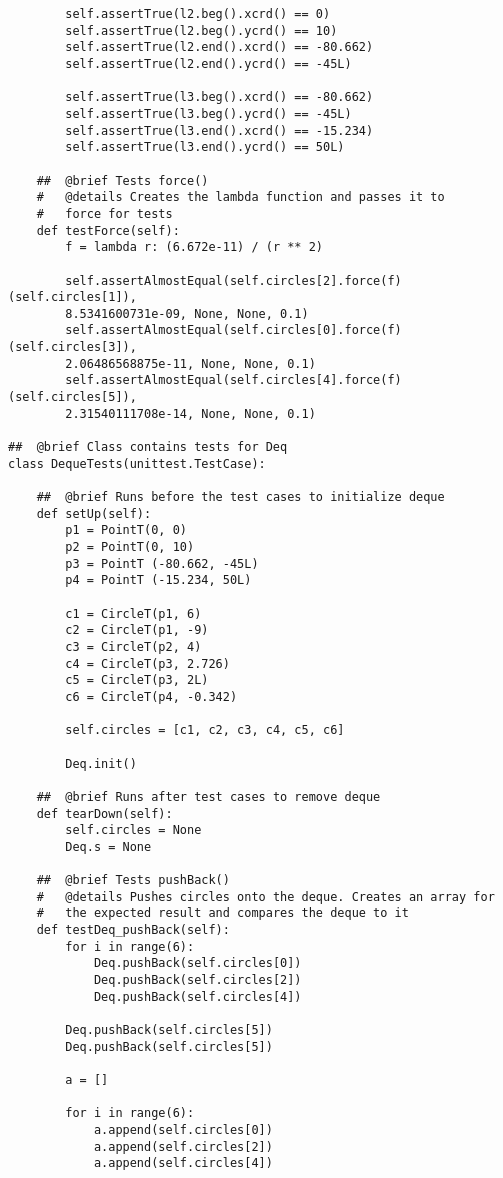 \documentclass{article}
\begin{document}
\begin{lstlisting}
        self.assertTrue(l2.beg().xcrd() == 0)
        self.assertTrue(l2.beg().ycrd() == 10)
        self.assertTrue(l2.end().xcrd() == -80.662)
        self.assertTrue(l2.end().ycrd() == -45L)

        self.assertTrue(l3.beg().xcrd() == -80.662)
        self.assertTrue(l3.beg().ycrd() == -45L)
        self.assertTrue(l3.end().xcrd() == -15.234)
        self.assertTrue(l3.end().ycrd() == 50L)
        
    ##  @brief Tests force()
    #   @details Creates the lambda function and passes it to 
    #   force for tests
    def testForce(self):
        f = lambda r: (6.672e-11) / (r ** 2)
        
        self.assertAlmostEqual(self.circles[2].force(f)(self.circles[1]),
        8.5341600731e-09, None, None, 0.1)
        self.assertAlmostEqual(self.circles[0].force(f)(self.circles[3]),
        2.06486568875e-11, None, None, 0.1)
        self.assertAlmostEqual(self.circles[4].force(f)(self.circles[5]),
        2.31540111708e-14, None, None, 0.1)

##  @brief Class contains tests for Deq     
class DequeTests(unittest.TestCase):
    
    ##  @brief Runs before the test cases to initialize deque
    def setUp(self):
        p1 = PointT(0, 0)
        p2 = PointT(0, 10)
        p3 = PointT (-80.662, -45L)
        p4 = PointT (-15.234, 50L)

        c1 = CircleT(p1, 6)
        c2 = CircleT(p1, -9)
        c3 = CircleT(p2, 4)
        c4 = CircleT(p3, 2.726)
        c5 = CircleT(p3, 2L)
        c6 = CircleT(p4, -0.342)

        self.circles = [c1, c2, c3, c4, c5, c6]

        Deq.init()

    ##  @brief Runs after test cases to remove deque
    def tearDown(self):
        self.circles = None
        Deq.s = None
        
    ##  @brief Tests pushBack()
    #   @details Pushes circles onto the deque. Creates an array for 
    #   the expected result and compares the deque to it
    def testDeq_pushBack(self):
        for i in range(6):
            Deq.pushBack(self.circles[0])
            Deq.pushBack(self.circles[2])
            Deq.pushBack(self.circles[4])

        Deq.pushBack(self.circles[5])
        Deq.pushBack(self.circles[5])

        a = []

        for i in range(6):
            a.append(self.circles[0])
            a.append(self.circles[2])
            a.append(self.circles[4])


\end{lstlisting}
\end{document}
